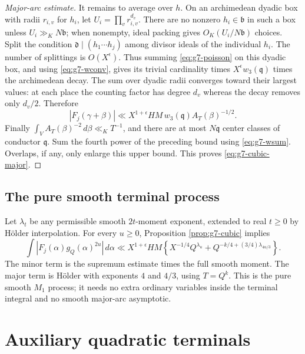 \documentclass[11pt]{amsart}
\theoremstyle{definition}
\numberwithin{equation}{section}
\begin{document}
\begin{proof}[Major-arc estimate]
It remains to average over $h$.  On an archimedean dyadic box with radii
$r_{i,v}$ for $h_i$, let $U_i=\prod_v r_{i,v}^{d_v}$.
There are no nonzero $h_i\in\mathfrak b$ in such a box unless
$U_i\gg_KN\mathfrak b$; when nonempty, ideal packing gives
$O_K(U_i/N\mathfrak b)$ choices.
Split the condition $\mathfrak d\mid(h_1\cdots h_j)$ among divisor ideals
of the individual $h_i$.  The number of splittings is $O(X^\epsilon)$.
Thus summing \eqref{eq:g7-poisson} on this dyadic box, and using
\eqref{eq:g7-wconv}, gives its trivial cardinality times
$X^\epsilon w_3(\mathfrak q)$ times the archimedean decay.
The sum over dyadic radii converges toward their largest values: at each
place the counting factor has degree $d_v$ whereas the decay removes only
$d_v/2$.  Therefore
\[
 |F_j(\gamma+\beta)|
 \ll X^{1+\epsilon}HM\,w_3(\mathfrak q) A_T(\beta)^{-1/2}.
\]
Finally $\int_{V}A_T(\beta)^{-2}\,d\beta\ll_KT^{-1}$,
and there are at most $N\mathfrak q$ center classes of conductor
$\mathfrak q$.  Sum the fourth power of the preceding bound using
\eqref{eq:g7-wsum}.  Overlaps, if any, only enlarge this upper bound.
This proves \eqref{eq:g7-cubic-major}.
\end{proof}

\subsection{The pure smooth terminal process}

Let $\lambda_t$ be any permissible smooth $2t$-moment exponent, extended to
real $t\ge0$ by H\"older interpolation.  For every $u\ge0$, Proposition
\ref{prop:g7-cubic} implies
\begin{equation}\label{eq:g7-M1-terminal}
 \int|F_j(\alpha)g_Q(\alpha)^{2u}|\,d\alpha
 \ll X^{1+\epsilon}HM
 \left\{X^{-1/4}Q^{\lambda_u}
       +Q^{-k/4+(3/4)\lambda_{4u/3}}\right\}.
\end{equation}
The minor term is the supremum estimate times the full smooth moment.
The major term is H\"older with exponents $4$ and $4/3$, using
$T=Q^k$.  This is the pure smooth $M_1$ process; it needs no extra ordinary
variables inside the terminal integral and no smooth major-arc asymptotic.

\section{Auxiliary quadratic terminals}
\label{sec:quadratic-terminals}
\label{sec:eighth-quadratic-terminal}
\label{sec:ninth-terminal}
\end{document}
